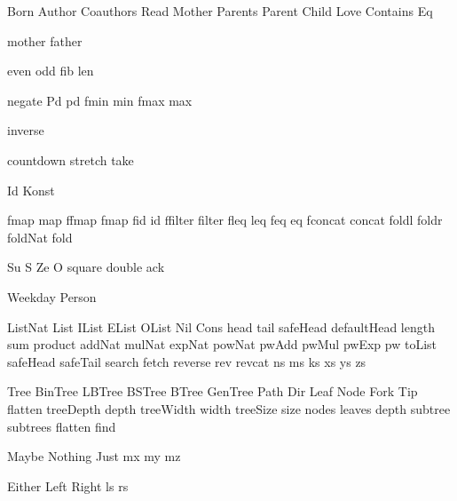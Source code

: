
\DefRel Born
\DefRel Author
\DefRel Coauthors
\DefRel Read
\DefRel Mother
\DefRel Parents
\DefRel Parent
\DefRel Child
\DefRel Love
\DefRel Contains
\DefRel Eq

\DefFun mother
\DefFun father

\DefFun even
\DefFun odd
\DefFun fib
\DefFun len

\DefFpf negate
\DefFPF Pd pd
\DefFPF fmin   min
\DefFPF fmax   max

\DefFpf inverse

\DefFpf countdown
\DefFpf stretch
\DefFpf take

\DefType Id
\DefType Konst

\DefFPF fmap     map
\DefFPF ffmap    fmap
\DefFPF fid      id
\DefFPF ffilter  filter
\DefFPF fleq     leq
\DefFPF feq      eq
\DefFPF fconcat  concat
\DefFpf foldl
\DefFpf foldr
\DefFpf foldNat
\DefFpf fold

\DefCONS Su S
\DefCONS Ze O
\DefFpf  square
\DefFpf  double
\DefFpf  ack

\DefType Weekday
\DefType Person

\DefType ListNat
\DefType List
\DefType IList
\DefType EList
\DefType OList
\DefCons Nil
\DefCons Cons
\DefFpf  head
\DefFpf  tail
\DefFpf  safeHead
\DefFpf  defaultHead
\DefFpf  length
\DefFpf  sum
\DefFpf  product
\DefFpf  addNat
\DefFpf  mulNat
\DefFpf  expNat
\DefFpf  powNat
\DefFpf  pwAdd
\DefFpf  pwMul
\DefFpf  pwExp
\DefFpf  pw
\DefFpf  toList
\DefFpf  safeHead
\DefFpf  safeTail
\DefFpf  search
\DefFpf  fetch
\DefFpf  reverse
\DefFpf  rev
\DefFpf  revcat
\DefVar  ns
\DefVar  ms
\DefVar  ks
\DefVar  xs
\DefVar  ys
\DefVar  zs

\DefType Tree
\DefType BinTree
\DefType LBTree
\DefType BSTree
\DefType BTree
\DefType GenTree
\DefType Path
\DefType Dir
\DefCons Leaf
\DefCons Node
\DefCons Fork
\DefCons Tip
\DefFpf  flatten
\DefFPF  treeDepth  depth
\DefFPF  treeWidth  width
\DefFPF  treeSize   size
\DefFpf  nodes
\DefFpf  leaves
\DefFpf  depth
\DefFpf  subtree
\DefFpf  subtrees
\DefFpf  flatten
\DefFpf  find


\DefType Maybe
\DefCons Nothing
\DefCons Just
\DefVar  mx
\DefVar  my
\DefVar  mz

\DefType Either
\DefCons Left
\DefCons Right
\DefVar  ls
\DefVar  rs

\def\bla{\mathrm{bla}}
\def\blu{\mathrm{blu}}

\def\persons{{\cal P}}
\let\pers=\persons

\def\euclid{\algorithmstylize{Euclid}}%

\def\Smile{\rel{\woohoo}}
\def\Frown{\rel{\boohoo}}

\def\oddAs#1{A_{[#1]}}

